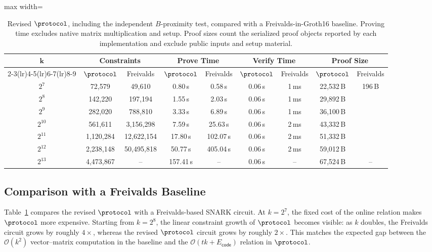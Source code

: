 \begin{table}[!t]
\centering
\setlength{\tabcolsep}{3.5pt}
\begin{adjustbox}{max width=\textwidth}
\begin{tabular}{c cc cc cc cc}
\toprule
\multirow{2}{*}{\(\boldsymbol{k}\)}
& \multicolumn{2}{c}{\textbf{Constraints}}
& \multicolumn{2}{c}{\textbf{Prove Time}}
& \multicolumn{2}{c}{\textbf{Verify Time}}
& \multicolumn{2}{c}{\textbf{Proof Size}} \\
\cmidrule(lr){2-3}\cmidrule(lr){4-5}\cmidrule(lr){6-7}\cmidrule(lr){8-9}
& \(\protocol\) & Freivalds
& \(\protocol\) & Freivalds
& \(\protocol\) & Freivalds
& \(\protocol\) & Freivalds \\
\midrule
$2^7$    & 72{,}579      & 49{,}610       & 0.80\,s   & 0.58\,s   & 0.06\,s & 1\,ms & 22{,}532\,B & \multirow{6}{*}{196\,B} \\
$2^8$    & 142{,}220     & 197{,}194      & 1.55\,s   & 2.03\,s   & 0.06\,s & 1\,ms & 29{,}892\,B & \\
$2^9$    & 282{,}020     & 788{,}810      & 3.33\,s   & 6.89\,s   & 0.06\,s & 1\,ms & 36{,}100\,B & \\
$2^{10}$ & 561{,}611     & 3{,}156{,}298  & 7.59\,s   & 25.63\,s  & 0.06\,s & 2\,ms & 43{,}332\,B & \\
$2^{11}$ & 1{,}120{,}284 & 12{,}622{,}154 & 17.80\,s  & 102.07\,s & 0.06\,s & 2\,ms & 51{,}332\,B & \\
$2^{12}$ & 2{,}238{,}148 & 50{,}495{,}818 & 50.77\,s  & 405.04\,s & 0.06\,s & 2\,ms & 59{,}012\,B & \\
$2^{13}$ & 4{,}473{,}867 & --             & 157.41\,s & --        & 0.06\,s & --    & 67{,}524\,B & -- \\
\bottomrule
\end{tabular}
\end{adjustbox}
\vspace{4pt}
\caption{Revised \(\protocol\), including the independent \(B\)-proximity
test, compared with a Freivalds-in-Groth16 baseline.  Proving time excludes
native matrix multiplication and setup.  Proof sizes count the serialized
proof objects reported by each implementation and exclude public inputs and
setup material.}
\label{tab:lamp-vs-freivalds}
\end{table}

\subsection{Comparison with a Freivalds Baseline}
\label{sec:eval-freivalds}
Table~\ref{tab:lamp-vs-freivalds} compares the revised \(\protocol\) with a
Freivalds-based SNARK circuit.  At \(k=2^7\), the fixed cost of the online
relation makes \(\protocol\) more expensive.  Starting from \(k=2^8\), the
linear constraint growth of \(\protocol\) becomes visible: as \(k\) doubles,
the Freivalds circuit grows by roughly \(4\times\), whereas the revised
\(\protocol\) circuit grows by roughly \(2\times\).  This matches the expected
gap between the \(\mathcal{O}(k^2)\) vector--matrix computation in the baseline
and the \(\mathcal{O}(tk+E_{\mathsf{code}})\) relation in \(\protocol\).

